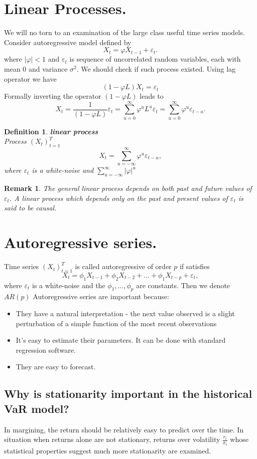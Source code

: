 \documentclass{book}
\newtheorem{definition}{Definition}[section]
\newtheorem{remark}{Remark}[section]
\begin{document}
\section{Linear Processes.}
We will no torn to an examination of the large class useful time series models.
Consider autoregressive model defined by
$$
X_{t}=\varphi X_{t-1}+\varepsilon_{t}.
$$
where $|\varphi|<1$ and $\varepsilon_{t}$ is sequence of uncorrelated random variables, each with mean $0$ and variance $\sigma^{2}.$ We should check if such process existed. Using lag operator we have
$$
(1-\varphi L)X_{t}=\varepsilon_{t}
$$
Formally inverting the operator $(1-\varphi L)$ leads to 
$$
X_{t}=\frac{1}{(1-\varphi L)}\varepsilon_{t}=\sum_{u=0}^{\infty}\varphi^{u}L^{u}\varepsilon_{t}=\sum_{u=0}^{\infty}\varphi^{u}\varepsilon_{t-u}.
$$
\begin{definition}\textbf{linear process}\\
Process $(X_{t})_{t=1}^{T}$
$$
X_{t}=\sum_{u=-\infty}^{\infty}\varphi^{u}\varepsilon_{t-u},
$$
where $\varepsilon_{t}$ is a white-noise and $\sum_{u=-\infty}^{\infty}|\varphi|^{u}$
\end{definition}
\begin{remark}
The general linear process depends on both past and future values of $\varepsilon_{t}$. A linear process which depends only on the past and present values of $\varepsilon_{t}$ is said to be causal.
\end{remark}
\section{Autoregressive series.}
Time series $(X_{t})_{t=1}^{T}$ is called autoregressive of order $p$ if satisfies
$$
X_{t}=\phi_{1}X_{t-1}+\phi_{2}X_{t-2}+\dots+\phi_{1}X_{t-p}+\varepsilon_{t},
$$ 
where $\varepsilon_{t}$ is a white-noise and the $\phi_{1},\dots,\phi_{p}$ are constants. Then we denote $AR(p)$
Autoregressive series are important because:
\begin{itemize}
\item They have a natural interpretation - the next value observed is a slight perturbation of a simple function of the most recent observations
\item It's easy to estimate their parameters. It can be done with standard regression software.
\item They are easy to forecast.
\end{itemize}
\subsection{Why is stationarity important in the historical VaR model?}
In margining, the return should be relatively easy to predict over the time. In situation when returns alone are not stationary, returns over volatility $\frac{r_{t}}{\sigma_{t}}$ whose statistical properties suggest much more stationarity are examined.
\end{document}
